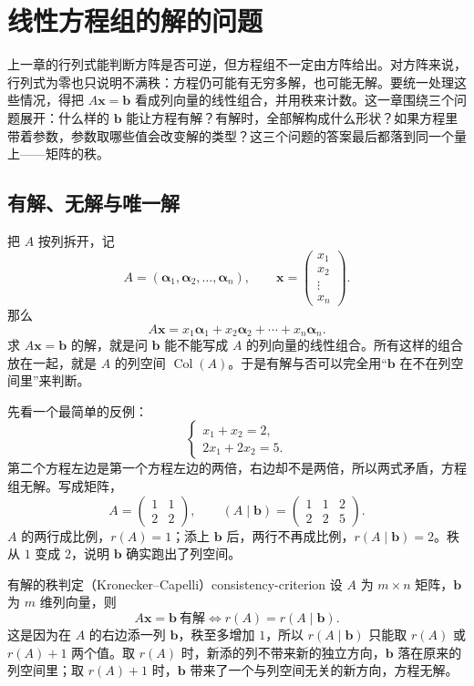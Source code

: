 \section{线性方程组的解的问题}

上一章的行列式能判断方阵是否可逆，但方程组不一定由方阵给出。对方阵来说，行列式为零也只说明不满秩：方程仍可能有无穷多解，也可能无解。要统一处理这些情况，得把 \(A\bm{x}=\bm{b}\) 看成列向量的线性组合，并用秩来计数。这一章围绕三个问题展开：什么样的 \(\bm{b}\) 能让方程有解？有解时，全部解构成什么形状？如果方程里带着参数，参数取哪些值会改变解的类型？这三个问题的答案最后都落到同一个量上——矩阵的秩。

\subsection{有解、无解与唯一解}

把 \(A\) 按列拆开，记
\[
A=(\bm{\alpha}_1,\bm{\alpha}_2,\ldots,\bm{\alpha}_n),\qquad
\bm{x}=\begin{pmatrix}x_1\\x_2\\\vdots\\x_n\end{pmatrix}.
\]
那么
\[
A\bm{x}=x_1\bm{\alpha}_1+x_2\bm{\alpha}_2+\cdots+x_n\bm{\alpha}_n.
\]
求 \(A\bm{x}=\bm{b}\) 的解，就是问 \(\bm{b}\) 能不能写成 \(A\) 的列向量的线性组合。所有这样的组合放在一起，就是 \(A\) 的列空间 \(\operatorname{Col}(A)\)。于是有解与否可以完全用“\(\bm{b}\) 在不在列空间里”来判断。

先看一个最简单的反例：
\[
\begin{cases}
x_1+x_2=2,\\
2x_1+2x_2=5.
\end{cases}
\]
第二个方程左边是第一个方程左边的两倍，右边却不是两倍，所以两式矛盾，方程组无解。写成矩阵，
\[
A=\begin{pmatrix}1&1\\2&2\end{pmatrix},\qquad
(A\mid \bm{b})=\left(\begin{array}{cc|c}1&1&2\\2&2&5\end{array}\right).
\]
\(A\) 的两行成比例，\(r(A)=1\)；添上 \(\bm{b}\) 后，两行不再成比例，\(r(A\mid \bm{b})=2\)。秩从 \(1\) 变成 \(2\)，说明 \(\bm{b}\) 确实跑出了列空间。

\begin{conclusion}{有解的秩判定（Kronecker--Capelli）}{consistency-criterion}
    设 \(A\) 为 \(m\times n\) 矩阵，\(\bm{b}\) 为 \(m\) 维列向量，则
    \[
    A\bm{x}=\bm{b}\ \text{有解}
    \iff r(A)=r(A\mid \bm{b}).
    \]
    这是因为在 \(A\) 的右边添一列 \(\bm{b}\)，秩至多增加 \(1\)，所以 \(r(A\mid \bm{b})\) 只能取 \(r(A)\) 或 \(r(A)+1\) 两个值。取 \(r(A)\) 时，新添的列不带来新的独立方向，\(\bm{b}\) 落在原来的列空间里；取 \(r(A)+1\) 时，\(\bm{b}\) 带来了一个与列空间无关的新方向，方程无解。
\end{conclusion}

